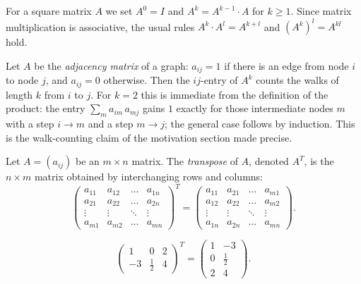 \begin{definition}
For a square matrix $A$ we set $A^0 = I$ and $A^{k} = A^{k-1}\cdot A$ for $k\geq 1$. Since matrix
multiplication is associative, the usual rules $A^k\cdot A^l = A^{k+l}$ and $(A^k)^l = A^{kl}$ hold.
\end{definition}

\begin{example}
Let $A$ be the \emph{adjacency matrix} of a graph: $a_{ij} = 1$ if there is an edge from node $i$ to node
$j$, and $a_{ij} = 0$ otherwise. Then the $ij$-entry of $A^k$ counts the walks of length $k$ from $i$ to
$j$. For $k = 2$ this is immediate from the definition of the product: the entry
$\sum_{m} a_{im}\,a_{mj}$ gains $1$ exactly for those intermediate nodes $m$ with a step $i\to m$ and a
step $m\to j$; the general case follows by induction. This is the walk-counting claim of the motivation
section made precise.
\end{example}

\begin{definition}[Transpose]
Let $A=(a_{ij})$ be an $m\times n$ matrix. The \emph{transpose} of $A$, denoted $A^T$, is the $n\times m$
matrix obtained by interchanging rows and columns:
\[
\left( \begin{array}{cccc}
a_{11} & a_{12} & \ldots & a_{1n} \\
a_{21} & a_{22} & \ldots & a_{2n} \\
\vdots & \vdots & \ddots & \vdots \\
a_{m1} & a_{m2} & \ldots & a_{mn}
\end{array} \right)^T =
\left( \begin{array}{cccc}
a_{11} & a_{21} & \ldots & a_{m1} \\
a_{12} & a_{22} & \ldots & a_{m2} \\
\vdots & \vdots & \ddots & \vdots \\
a_{1n} & a_{2n} & \ldots & a_{mn}
\end{array} \right).
\]
\end{definition}

\begin{example}
\[
\left( \begin{array}{ccc} 1 & 0 & 2 \\ -3 & \tfrac{1}{2} & 4 \end{array} \right)^T =
\left( \begin{array}{cc} 1 & -3 \\ 0 & \tfrac{1}{2} \\ 2 & 4 \end{array} \right).
\]
\end{example}

